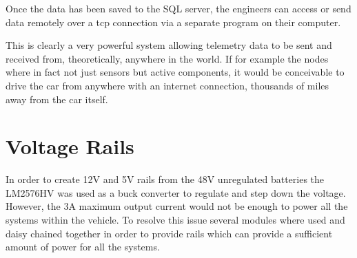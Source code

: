\documentclass[10pt,a4paper]{article}
\begin{document}
Once the data has been saved to the SQL server, the engineers can access or send data remotely over a tcp connection via a separate program on their computer.

This is clearly a very powerful system allowing telemetry data to be sent and received from, theoretically,  anywhere in the world. If for example the nodes where in fact not just sensors but active components, it would be conceivable to drive the car from anywhere with an internet connection, thousands of miles away from the car itself.

\section{Voltage Rails}
In order to create 12V and 5V rails from the 48V unregulated batteries the LM2576HV was used as a buck converter to regulate and step down the voltage. However, the 3A maximum output current would not be enough to power all the systems within the vehicle. To resolve this issue several modules where used and daisy chained together in order to provide rails which can provide a sufficient amount of power for all the systems. 
\end{document}
